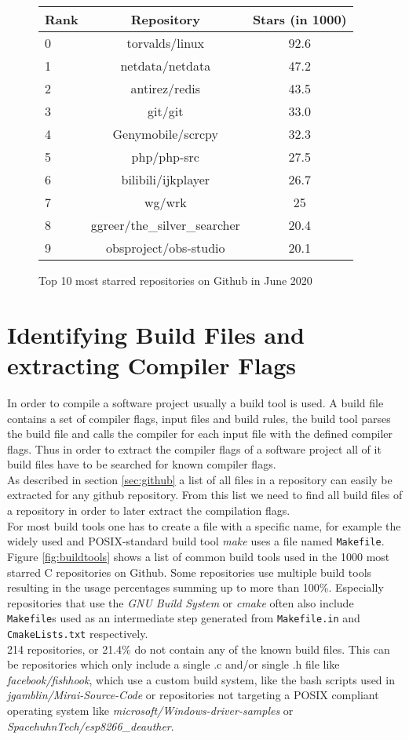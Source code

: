 \documentclass[9pt, a4paper, twocolumn]{article}
\begin{document}
\begin{figure}
	\centering
	\begin{tabular}{l | c | c}
		Rank & Repository & Stars (in 1000) \\
		\hline
		0 & torvalds/linux & 92.6 \\
		1 & netdata/netdata & 47.2 \\
		2 & antirez/redis & 43.5 \\
		3 & git/git & 33.0 \\
		4 & Genymobile/scrcpy & 32.3 \\
		5 & php/php-src & 27.5 \\
		6 & bilibili/ijkplayer & 26.7 \\
		7 & wg/wrk & 25 \\
		8 & ggreer/the\_silver\_searcher & 20.4 \\
		9 & obsproject/obs-studio & 20.1 \\
	\end{tabular}
	\caption{Top 10 most starred repositories on Github in June 2020}
	\label{fig:github-top}
\end{figure}

\section{Identifying Build Files and extracting Compiler Flags} \label{sec:buildfiles}
In order to compile a software project usually a build tool is used. A build file contains a set of compiler flags, input files and build rules, the build tool parses the build file and calls the compiler for each input file with the defined compiler flags. Thus in order to extract the compiler flags of a software project all of it build files have to be searched for known compiler flags. \\
As described in section \ref{sec:github} a list of all files in a repository can easily be extracted for any github repository. From this list we need to find all build files of a repository in order to later extract the compilation flags. \\
For most build tools one has to create a file with a specific name, for example the widely used and POSIX-standard build tool \textit{make} uses a file named \verb'Makefile'. Figure \ref{fig:buildtools} shows a list of common build tools used in the 1000 most starred C repositories on Github. Some repositories use multiple build tools resulting in the usage percentages summing up to more than 100\%. Especially repositories that use the \textit{GNU Build System} or \textit{cmake} often also include \verb'Makefile's used as an intermediate step generated from \verb'Makefile.in' and \verb'CmakeLists.txt' respectively\cite{gnu-build, cmake}. \\
214 repositories, or 21.4\% do not contain any of the known build files. This can be repositories which only include a single .c and/or single .h file like \textit{facebook/fishhook}, which use a custom build system, like the bash scripts used in \textit{jgamblin/Mirai-Source-Code} or repositories not targeting a POSIX compliant operating system like \textit{microsoft/Windows-driver-samples} or \textit{SpacehuhnTech/esp8266\_deauther}.
\end{document}
